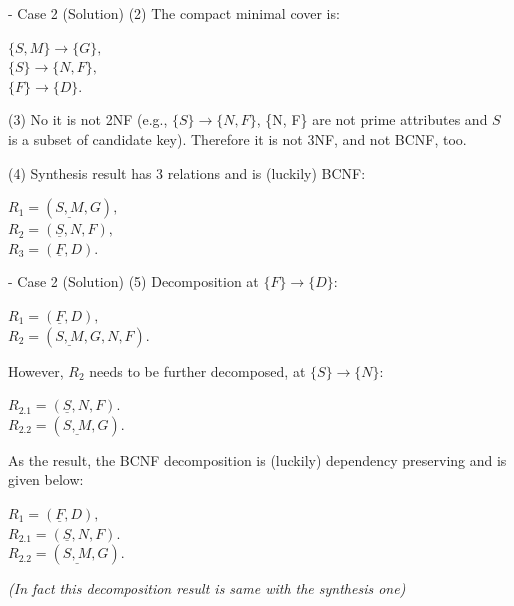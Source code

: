 \begin{frame}[fragile]{ - Case 2 (Solution)}
	(2) The compact minimal cover is:\\\vspace{5pt}
	
	$\{S, M\} \rightarrow \{G\},$\\
	$\{S\}  \rightarrow \{N, F\},$\\
	$\{F\} \rightarrow \{D\}.$\\\vspace{5pt}
	
	(3)  No it is not 2NF (e.g., $\{S\}\rightarrow\{N, F\}$, \{N, F\} are not prime attributes and $S$ is a subset of candidate key). Therefore it is not 3NF, and not BCNF, too.\\\vspace{5pt}
	
	(4) Synthesis result has 3 relations and is (luckily) BCNF: \\\vspace{5pt}
	
	$R_1 = (\underline{S,M}, G),$\\
	$R_2 = (\underline{S}, N, F),$\\
	$R_3 = (\underline{F}, D).$\\\vspace{5pt}
	
\end{frame}

\begin{frame}[fragile]{ - Case 2 (Solution)}
	(5) Decomposition at $\{F\} \rightarrow \{D\}$:\\\vspace{5pt}
	
	$R_1 = (\underline{F}, D),$\\
	$R_2 = (\underline{S,M}, G, N, F).$\\\vspace{5pt}
	
	However, $R_2$ needs to be further decomposed, at $\{S\} \rightarrow \{N\}$:\\\vspace{5pt}
	
	$R_{2.1} = (\underline{S}, N, F).$\\
	$R_{2.2} = (\underline{S,M}, G).$\\\vspace{5pt}
	
	As the result, the BCNF decomposition is (luckily) dependency preserving and is given below:\\\vspace{5pt}
	
	$R_1 = (\underline{F}, D),$\\
	$R_{2.1} = (\underline{S}, N, F).$\\
	$R_{2.2} = (\underline{S,M}, G).$\\\vspace{5pt}
	
	\textit{(In fact this decomposition result is same with the synthesis one)}
\end{frame}

